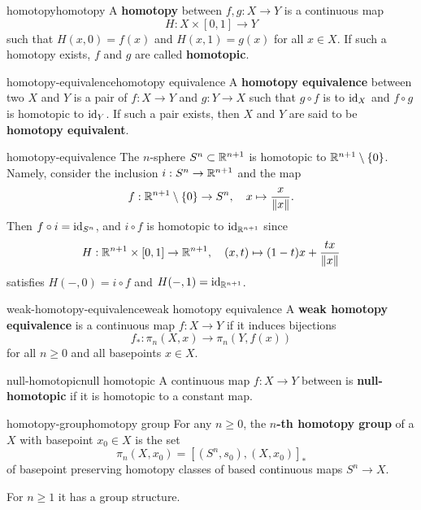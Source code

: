 \begin{topic}{homotopy}{homotopy}
    A \textbf{homotopy} between  $f, g : X \to Y$ is a continuous map
    \[ H : X \times [0, 1] \to Y \]
    such that $H(x, 0) = f(x)$ and $H(x, 1) = g(x)$ for all $x \in X$. If such a homotopy exists, $f$ and $g$ are called \textbf{homotopic}.
\end{topic}

\begin{topic}{homotopy-equivalence}{homotopy equivalence}
    A \textbf{homotopy equivalence} between two  $X$ and $Y$ is a pair of  $f : X \to Y$ and $g : Y \to X$ such that $g \circ f$ is  to $\textup{id}_X$ and $f \circ g$ is homotopic to $\textup{id}_Y$. If such a pair exists, then $X$ and $Y$ are said to be \textbf{homotopy equivalent}.
\end{topic}

\begin{example}{homotopy-equivalence}
    The $n$-sphere $S^n \subset \mathbb{R}^{n + 1}$ is homotopic to $\mathbb{R}^{n + 1} \setminus \{ 0 \}$. Namely, consider the inclusion $i : S^n \to \mathbb{R}^{n + 1}$ and the map
    \[ f : \mathbb{R}^{n + 1} \setminus \{ 0 \} \to S^n, \quad x \mapsto \frac{x}{\|x\|} . \]
    Then $f \circ i = \textup{id}_{S^n}$, and $i \circ f$ is homotopic to $\textup{id}_{\mathbb{R}^{n + 1}}$ since
    \[ H : \mathbb{R}^{n + 1} \times [0, 1] \to \mathbb{R}^{n + 1}, \quad (x, t) \mapsto (1 - t) x + \frac{tx}{\|x\|} \]
    satisfies $H(-, 0) = i \circ f$ and $H(-, 1) = \textup{id}_{\mathbb{R}^{n + 1}}$.
\end{example}

\begin{topic}{weak-homotopy-equivalence}{weak homotopy equivalence}
    A \textbf{weak homotopy equivalence} is a continuous map $f : X \to Y$ if it induces bijections
    \[ f_* : \pi_n(X, x) \to \pi_n(Y, f(x)) \]
    for all $n \ge 0$ and all basepoints $x \in X$.
\end{topic}

\begin{topic}{null-homotopic}{null homotopic}
    A continuous map $f : X \to Y$ between  is \textbf{null-homotopic} if it is homotopic to a constant map.
\end{topic}

\begin{topic}{homotopy-group}{homotopy group}
    For any $n \ge 0$, the \textbf{$n$-th homotopy group} of a  $X$ with basepoint $x_0 \in X$ is the set
    \[ \pi_n(X, x_0) = [(S^n, s_0), (X, x_0)]_* \]
    of basepoint preserving homotopy classes of based continuous maps $S^n \to X$.
    
    For $n \ge 1$ it has a group structure.
\end{topic}

